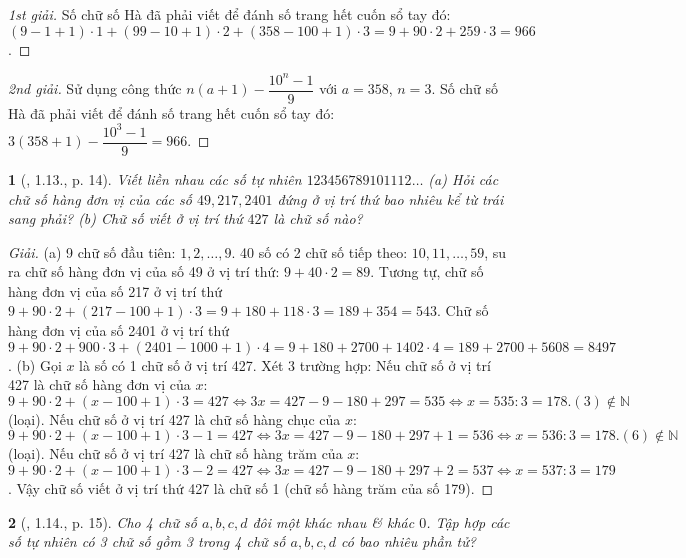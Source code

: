 \documentclass{article}
\newtheorem{baitoan}{}
\begin{document}
\begin{proof}[1st giải]
	Số chữ số Hà đã phải viết để đánh số trang hết cuốn sổ tay đó: $(9 - 1 + 1)\cdot1 + (99 - 10 + 1)\cdot2 + (358 -100 + 1)\cdot3 = 9 + 90\cdot2 + 259\cdot3 = 966$.
\end{proof}

\begin{proof}[2nd giải]
	Sử dụng công thức $n(a + 1) - \dfrac{10^n - 1}{9}$ với $a = 358$, $n = 3$. Số chữ số Hà đã phải viết để đánh số trang hết cuốn sổ tay đó: $3(358 + 1) - \dfrac{10^3 - 1}{9} = 966$.
\end{proof}

\begin{baitoan}[\cite{Binh_boi_duong_Toan_6_tap_1}, 1.13., p. 14]
	Viết liền nhau các số tự nhiên $123456789101112\ldots$ (a) Hỏi các chữ số hàng đơn vị của các số $49,217,2401$ đứng ở vị trí thứ bao nhiêu kể từ trái sang phải? (b) Chữ số viết ở vị trí thứ $427$ là chữ số nào?
\end{baitoan}

\begin{proof}[Giải]
	(a) 9 chữ số đầu tiên: $1,2,\ldots,9$. 40 số có 2 chữ số tiếp theo: $10,11,\ldots,59$, su ra chữ số hàng đơn vị của số 49 ở vị trí thứ: $9 + 40\cdot2 = 89$. Tương tự, chữ số hàng đơn vị của số 217 ở vị trí thứ $9 + 90\cdot2 + (217 - 100 + 1)\cdot3 = 9 + 180 + 118\cdot3 = 189 + 354 = 543$. Chữ số hàng đơn vị của số 2401 ở vị trí thứ $9 + 90\cdot2 + 900\cdot3 + (2401 - 1000 + 1)\cdot4 = 9 + 180 + 2700 + 1402\cdot4 = 189 + 2700 + 5608 = 8497$. (b) Gọi $x$ là số có 1 chữ số ở vị trí 427. Xét 3 trường hợp: Nếu chữ số ở vị trí 427 là chữ số hàng đơn vị của $x$: $9 + 90\cdot2 + (x - 100 + 1)\cdot3 = 427\Leftrightarrow3x = 427 - 9 - 180 + 297 = 535\Leftrightarrow x = 535:3 = 178.(3)\notin\mathbb{N}$ (loại). Nếu chữ số ở vị trí 427 là chữ số hàng chục của $x$: $9 + 90\cdot2 + (x - 100 + 1)\cdot3 - 1 = 427\Leftrightarrow3x = 427 - 9 - 180 + 297 + 1 = 536\Leftrightarrow x = 536:3 = 178.(6)\notin\mathbb{N}$ (loại). Nếu chữ số ở vị trí 427 là chữ số hàng trăm của $x$: $9 + 90\cdot2 + (x - 100 + 1)\cdot3 - 2 = 427\Leftrightarrow3x = 427 - 9 - 180 + 297 + 2 = 537\Leftrightarrow x = 537:3 = 179$. Vậy chữ số viết ở vị trí thứ 427 là chữ số 1 (chữ số hàng trăm của số 179).
\end{proof}

\begin{baitoan}[\cite{Binh_boi_duong_Toan_6_tap_1}, 1.14., p. 15]
	Cho 4 chữ số $a,b,c,d$ đôi một khác nhau \& khác $0$. Tập hợp các số tự nhiên có 3 chữ số gồm 3 trong 4 chữ số $a,b,c,d$ có bao nhiêu phần tử?
\end{baitoan}
\end{document}

